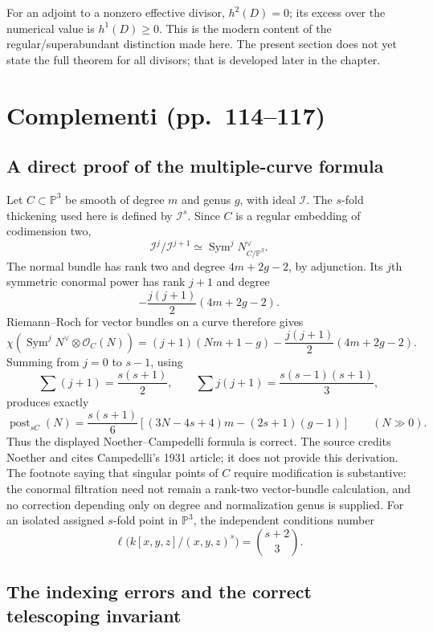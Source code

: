 For an adjoint to a nonzero effective divisor, \(h^2(D)=0\); its excess over the numerical value is \(h^1(D)\geq0\). This is the modern content of the regular/superabundant distinction made here. The present section does not yet state the full theorem for all divisors; that is developed later in the chapter.

\section[Complementi]{Complementi (pp.~114--117)}\label{enriques-iv-5}

\subsection{A direct proof of the multiple-curve formula}

Let \(C\subset\mathbb P^3\) be smooth of degree \(m\) and genus \(g\), with ideal \(\mathcal I\). The \(s\)-fold thickening used here is defined by \(\mathcal I^s\). Since \(C\) is a regular embedding of codimension two, \[
 \mathcal I^j/\mathcal I^{j+1}\simeq\operatorname{Sym}^j N_{C/\mathbb P^3}^{\vee}.
\] The normal bundle has rank two and degree \(4m+2g-2\), by adjunction. Its \(j\)th symmetric conormal power has rank \(j+1\) and degree \[
 -\frac{j(j+1)}2(4m+2g-2).
\] Riemann--Roch for vector bundles on a curve therefore gives \[
 \chi\!\left(\operatorname{Sym}^jN^\vee\otimes\mathcal O_C(N)\right)
 =(j+1)(Nm+1-g)-\frac{j(j+1)}2(4m+2g-2).
\] Summing from \(j=0\) to \(s-1\), using \[
 \sum(j+1)=\frac{s(s+1)}2,\qquad
 \sum j(j+1)=\frac{s(s-1)(s+1)}3,
\] produces exactly \[
 \operatorname{post}_{sC}(N)
 =\frac{s(s+1)}6
 \left[(3N-4s+4)m-(2s+1)(g-1)\right]
 \qquad(N\gg0).
\] Thus the displayed Noether--Campedelli formula is correct. The source credits Noether and cites Campedelli's 1931 article; it does not provide this derivation. The footnote saying that singular points of \(C\) require modification is substantive: the conormal filtration need not remain a rank-two vector-bundle calculation, and no correction depending only on degree and normalization genus is supplied. For an isolated assigned \(s\)-fold point in \(\mathbb P^3\), the independent conditions number \[
 \ell\bigl(k[x,y,z]/(x,y,z)^s\bigr)=\binom{s+2}{3}.
\]

\subsection{The indexing errors and the correct telescoping invariant}

